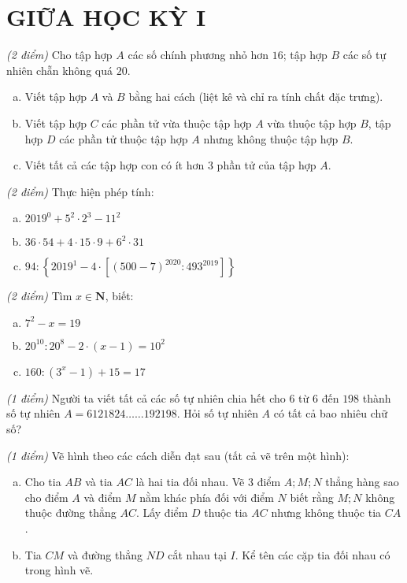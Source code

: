 \section{GIỮA HỌC KỲ I}
\setcounter{ex}{0}
\begin{ex}  \textit{(2 điểm)} Cho tập hợp $A$ các số chính phương nhỏ hơn $16$; tập hợp $B$ các số tự nhiên chẵn không quá $20$.
\begin{enumerate}[a)]
\item Viết tập hợp $A$ và $B$ bằng hai cách (liệt kê và chỉ ra tính chất đặc trưng).
\item Viết tập hợp $C$ các phần tử vừa thuộc tập hợp $A$ vừa thuộc tập hợp $B$, tập hợp $D$ các phần tử thuộc tập hợp $A$ nhưng không thuộc tập hợp $B$. 
\item Viết tất cả các tập hợp con có ít hơn $3$ phần tử của tập hợp $A$.

\end{enumerate}
\end{ex}     \begin{ex} \textit{(2 điểm)} Thực hiện phép tính:
\begin{enumerate} [a)]
\item ${2019^0} + {5^2} \cdot {2^3} - {11^2}$
\item $36 \cdot 54 + 4 \cdot 15 \cdot 9 + {6^2} \cdot 31$
\item $94:\left\{ {{{2019}^1} - 4 \cdot \left[ {{{\left( {500 - 7} \right)}^{2020}}:{{493}^{2019}}} \right]} \right\} $ 

\end{enumerate}
\end{ex}     \begin{ex} \textit{(2 điểm)} Tìm $x \in \mathbf{N}$, biết:
 \begin{enumerate}[a)]
\item ${7^2} - x = 19$
\item ${20^{10}}:{20^8} - 2 \cdot \left( {x - 1} \right) = {10^2}$
\item $160:\left( {{3^x} - 1} \right) + 15 = 17$

\end{enumerate}
\end{ex}     \begin{ex} \textit{(1 điểm)} Người ta viết tất cả các số tự nhiên chia hết cho $6$ từ $6$ đến $198$ thành số tự nhiên $A=6121824……192198$. Hỏi số tự nhiên $A$ có tất cả bao nhiêu chữ số?\\
\end{ex}     \begin{ex} \textit{(1 điểm)} Vẽ hình theo các cách diễn đạt sau (tất cả vẽ trên một hình): 
 \begin{enumerate}[a)]
\item Cho tia $AB$ và tia $AC$ là hai tia đối nhau. Vẽ $3$ điểm $A; M; N$ thẳng hàng sao cho điểm $A$ và điểm $M$ nằm khác phía đối với điểm $N$ biết rằng $M; N$ không thuộc đường thẳng $AC$. Lấy điểm $D$ thuộc tia $AC$ nhưng không thuộc tia $CA$.
\item Tia $CM$ và đường thẳng $ND$ cắt nhau tại $I$. Kể tên các cặp tia đối nhau có trong hình vẽ.


\end{enumerate}
\end{ex}
